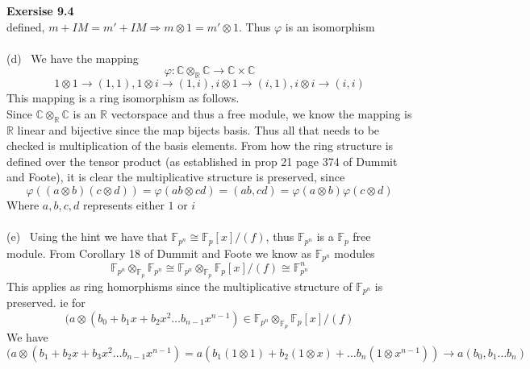 \documentclass[12pt]{article}
\newenvironment{ques}[1]{\textbf{Exersise #1}\vspace{1 mm}\\ }{\bigskip}
\theoremstyle{definition}
\newcommand{\R}{\mathbb R}
\newcommand{\C}{\mathbb C}
\newcommand{\F}{\mathbb F}
\newcommand{\tensor}{\otimes}
\begin{document}
\begin{ques}{9.4}
	defined, $m +IM = m' + IM \Rightarrow m \tensor 1 = m' \tensor 1$. Thus
	$\varphi$ is an isomorphism\\
	\\
	(d) \ 
	We have the mapping 
	$$\varphi:\C \tensor_\R \C \to \C \times \C$$
	$$1 \tensor 1 \to (1,1), 1 \tensor i \to (1,i), i \tensor 1 \to (i,1), i
	\tensor i \to (i,i)$$
	This mapping is a ring isomorphism as follows.\\
	Since $\C \tensor_\R \C$ is an $\R$ vectorspace and thus a free module, we
	know the mapping is $\R$ linear and bijective since the map bijects basis.
	Thus all that needs to be checked is multiplication of the basis elements.
	From how the ring structure is defined over the tensor product (as
	established in prop 21 page 374 of Dummit and Foote), it is clear the
	multiplicative structure is preserved, since 
	$$\varphi((a\tensor b)(c \tensor d)) = \varphi(ab \tensor cd) = (ab,cd) =
	\varphi(a \tensor b)\varphi(c \tensor d)$$
	Where $a,b,c,d$ represents either $1$  or $i$\\
	\\
	(e) \ Using the hint we have that $\F_{p^n} \cong \F_p[x]/(f)$, thus
	$\F_{p^n}$ is a $\F_p$ free module. From Corollary 18 of Dummit and Foote
	we know as $\F_{p^n}$ modules
	$$\F_{p^n} \tensor_{\F_p} \F_{p^n} \cong \F_{p^n} \tensor_{\F_p}
	\F_{p}[x]/(f) \cong \F_{p^n}^n$$
	This applies as ring homorphisms since the multiplicative structure of
	$\F_{p^n}$ is preserved. ie for 
	$$(a \tensor (b_0 + b_1x + b_2x^2 \dots b_{n-1}x^{n-1}) \in \F_{p^n}
	\tensor_{\F_p} \F_{p}[x] / (f)$$
	We have
	$$(a \tensor (b_1 + b_2x + b_3x^2 \dots b_{n-1}x^{n-1}) = a(b_1(1 \tensor
	1) + b_2(1 \tensor x) + \dots b_n(1 \tensor x^{n-1})) \to a(b_0,b_1 \dots b_n)$$
\end{ques}
\end{document}
